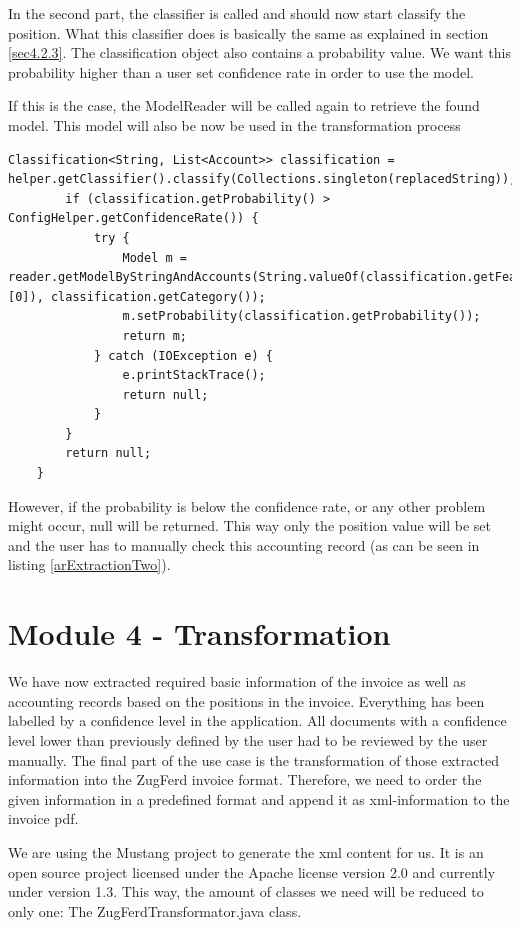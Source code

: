 In the second part, the classifier is called and should now start classify the position. What this classifier does is basically the same as explained in section \ref{sec4.2.3}. The classification object also contains a probability value. We want this probability higher than a user set confidence rate in order to use the model.

If  this is the case, the ModelReader will be called again to retrieve the found model. This model will also be now be used in the transformation process 

\begin{lstlisting}[caption={Classification of a position}]
        Classification<String, List<Account>> classification = helper.getClassifier().classify(Collections.singleton(replacedString));
        if (classification.getProbability() > ConfigHelper.getConfidenceRate()) {
            try {
                Model m = reader.getModelByStringAndAccounts(String.valueOf(classification.getFeatureset().toArray()[0]), classification.getCategory());
                m.setProbability(classification.getProbability());
                return m;
            } catch (IOException e) {
                e.printStackTrace();
                return null;
            }
        }
        return null;
    }
\end{lstlisting}

However, if the probability is below the confidence rate, or any other problem might occur, null will be returned. This way only the position value will be set and the user has to manually check this accounting record (as can be seen in listing \ref{arExtractionTwo}).
    
\section{Module 4 - Transformation}
\label{sec5.7}

We have now extracted required basic information of the invoice as well as accounting records based on the positions in the invoice. Everything has been labelled by a confidence level in the application. All documents with a confidence level lower than previously defined by the user had to be reviewed by the user manually.
The final part of the use case is the transformation of those extracted information into the ZugFerd invoice format. Therefore, we need to order the given information in a predefined format and append it as xml-information to the invoice pdf.

We are using the Mustang project to generate the xml content for us. It is an open source project licensed under the Apache license version 2.0 and currently under version 1.3. This way, the amount of classes we need will be reduced to only one: The ZugFerdTransformator.java class.

